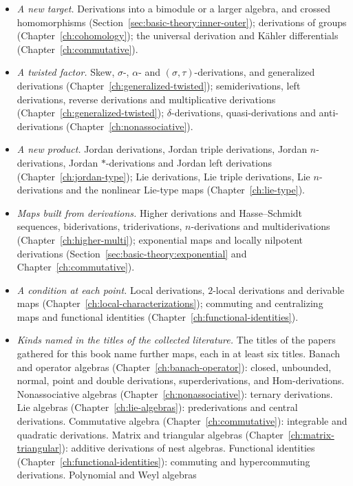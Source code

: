\begin{itemize}
\item \emph{A new target.} Derivations into a bimodule or a larger algebra, and
crossed homomorphisms (Section~\ref{sec:basic-theory:inner-outer}); derivations
of groups (Chapter~\ref{ch:cohomology}); the universal derivation and K\"ahler
differentials (Chapter~\ref{ch:commutative}).
\item \emph{A twisted factor.} Skew, $\sigma$-, $\alpha$- and
$(\sigma,\tau)$-derivations, and generalized derivations
(Chapter~\ref{ch:generalized-twisted}); semiderivations, left derivations,
reverse derivations and multiplicative derivations
(Chapter~\ref{ch:generalized-twisted}); $\delta$-derivations, quasi-derivations
and anti-derivations (Chapter~\ref{ch:nonassociative}).
\item \emph{A new product.} Jordan derivations, Jordan triple derivations,
Jordan $n$-derivations, Jordan $*$-derivations and Jordan left derivations
(Chapter~\ref{ch:jordan-type}); Lie derivations, Lie triple derivations, Lie
$n$-derivations and the nonlinear Lie-type maps (Chapter~\ref{ch:lie-type}).
\item \emph{Maps built from derivations.} Higher derivations and
Hasse--Schmidt sequences, biderivations, triderivations, $n$-derivations and
multiderivations (Chapter~\ref{ch:higher-multi}); exponential maps and locally nilpotent derivations (Section~\ref{sec:basic-theory:exponential} and
Chapter~\ref{ch:commutative}).
\item \emph{A condition at each point.} Local derivations, $2$-local
derivations and derivable maps (Chapter~\ref{ch:local-characterizations});
commuting and centralizing maps and functional identities
(Chapter~\ref{ch:functional-identities}).
\item \emph{Kinds named in the titles of the collected literature.} The titles
of the papers gathered for this book name further maps, each in at least
six titles. Banach and operator algebras
(Chapter~\ref{ch:banach-operator}): closed, unbounded, normal, point and
double derivations, superderivations, and Hom-derivations. Nonassociative
algebras (Chapter~\ref{ch:nonassociative}): ternary derivations. Lie algebras
(Chapter~\ref{ch:lie-algebras}): prederivations and central derivations.
Commutative algebra (Chapter~\ref{ch:commutative}): integrable and quadratic
derivations. Matrix and triangular algebras
(Chapter~\ref{ch:matrix-triangular}): additive derivations of nest algebras.
Functional identities (Chapter~\ref{ch:functional-identities}): commuting and
hypercommuting derivations. Polynomial and Weyl algebras

\end{itemize}

